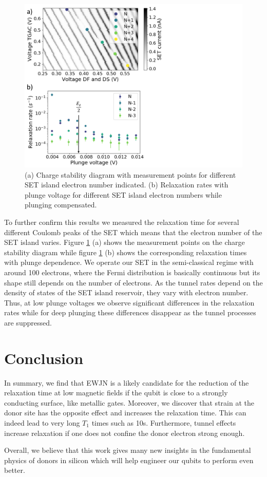 \documentclass[%
 reprint,
 amsmath,amssymb,
 aps,
]{revtex4-1}
\begin{document}
\begin{figure}
\centering
\includegraphics[width=0.8\columnwidth]{fig6.pdf}
\caption{
(a) Charge stability diagram with measurement points for different SET island electron number indicated. (b) Relaxation rates with plunge voltage for different SET island electron numbers while plunging compensated. 
}
\label{fig:electronnumberdependence}
\end{figure}

To further confirm this results we measured the relaxation time for several different Coulomb peaks of the SET which means that the electron number of the SET island varies.
Figure \ref{fig:electronnumberdependence} (a) shows the measurement points on the charge stability diagram while figure \ref{fig:electronnumberdependence} (b) shows the corresponding relaxation times with plunge dependence. We operate our SET in the semi-classical regime with around 100 electrons, where the Fermi distribution is basically continuous but its shape still depends on the number of electrons. As the tunnel rates depend on the density of states of the SET island reservoir, they vary with electron number. Thus, at low plunge voltages we observe significant differences in the relaxation rates while for deep plunging these differences disappear as the tunnel processes are suppressed. 


\section{\label{sec:conclusion}Conclusion}

In summary, we find that EWJN is a likely candidate for the reduction of the relaxation time at low magnetic fields if the qubit is close to a strongly conducting surface, like metallic gates. Moreover, we discover that strain at the donor site has the opposite effect and increases the relaxation time. This can indeed lead to very long $T_1$ times such as 10s. Furthermore, tunnel effects increase relaxation if one does not confine the donor electron strong enough. 

Overall, we believe that this work gives many new insights in the fundamental physics of donors in silicon which will help engineer our qubits to perform even better.  

 
\end{document}
